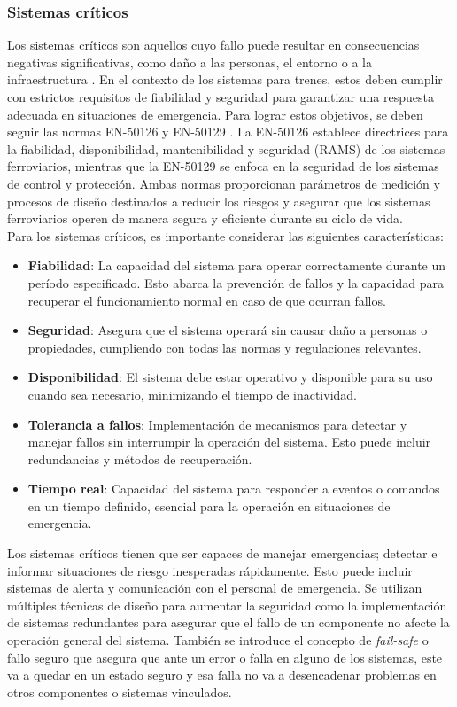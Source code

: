 \subsubsection{Sistemas críticos}


Los sistemas críticos son aquellos cuyo fallo puede resultar en consecuencias negativas significativas, como daño a las personas, el entorno o a la infraestructura \cite{norma_61508}. En el contexto de los sistemas para trenes, estos deben cumplir con estrictos requisitos de fiabilidad y seguridad para garantizar una respuesta adecuada en situaciones de emergencia. Para lograr estos objetivos, se deben seguir las normas EN-50126 y EN-50129 \cite{norma_50129}. La EN-50126 establece directrices para la fiabilidad, disponibilidad, mantenibilidad y seguridad (RAMS) de los sistemas ferroviarios, mientras que la EN-50129 se enfoca en la seguridad de los sistemas de control y protección. Ambas normas proporcionan parámetros de medición y procesos de diseño destinados a reducir los riesgos y asegurar que los sistemas ferroviarios operen de manera segura y eficiente durante su ciclo de vida.\\


Para los sistemas críticos, es importante considerar las siguientes características: 
\begin{itemize}
    \item \textbf{Fiabilidad}: La capacidad del sistema para operar correctamente durante un período especificado. Esto abarca la prevención de fallos y la capacidad para recuperar el funcionamiento normal en caso de que ocurran fallos. 
    \item \textbf{Seguridad}: Asegura que el sistema operará sin causar daño a personas o propiedades, cumpliendo con todas las normas y regulaciones relevantes.
    \item \textbf{Disponibilidad}: El sistema debe estar operativo y disponible para su uso cuando sea necesario, minimizando el tiempo de inactividad.
    \item \textbf{Tolerancia a fallos}: Implementación de mecanismos para detectar y manejar fallos sin interrumpir la operación del sistema. Esto puede incluir redundancias y métodos de recuperación.
    \item \textbf{Tiempo real}: Capacidad del sistema para responder a eventos o comandos en un tiempo definido, esencial para la operación en situaciones de emergencia.
\end{itemize}


Los sistemas críticos tienen que ser capaces de manejar emergencias; detectar e informar situaciones de riesgo inesperadas rápidamente. Esto puede incluir sistemas de alerta y comunicación con el personal de emergencia. Se utilizan múltiples técnicas de diseño para aumentar la seguridad como la implementación de sistemas redundantes para asegurar que el fallo de un componente no afecte la operación general del sistema. También se introduce el concepto de \textit{fail-safe} o fallo seguro que asegura que ante un error o falla en alguno de los sistemas, este va a quedar en un estado seguro y esa falla no va a desencadenar problemas en otros componentes o sistemas vinculados. \\


